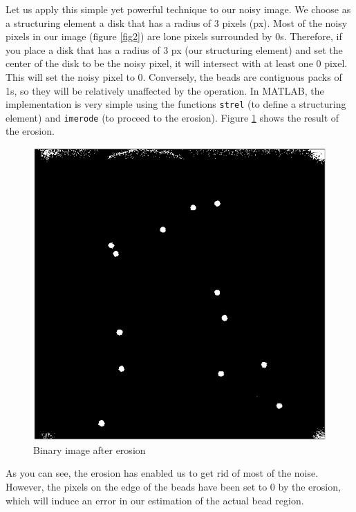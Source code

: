 \documentclass[a4paper]{article}
\begin{document}
\begin{enumerate}
    Let us apply this simple yet powerful technique to our noisy image. We choose as a structuring element a disk that has a radius of 3 pixels (px). Most of the noisy pixels in our image (figure \ref{fig2}) are lone pixels surrounded by 0s. Therefore, if you place a disk that has a radius of 3 px (our structuring element) and set the center of the disk to be the noisy pixel, it will intersect with at least one 0 pixel. This will set the noisy pixel to 0. Conversely, the beads are contiguous packs of 1s, so they will be relatively unaffected by the operation. In MATLAB, the implementation is very simple using the functions \verb|strel| (to define a structuring element) and \verb|imerode| (to proceed to the erosion). Figure \ref{fig3} shows the result of the erosion.
    
    \begin{figure}[H]
        \center
        \label{fig3}
        \includegraphics[scale=0.75]{firstbinerod.png}
        \caption{Binary image after erosion}
    \end{figure}

    As you can see, the erosion has enabled us to get rid of most of the noise. However, the pixels on the edge of the beads have been set to 0 by the erosion, which will induce an error in our estimation of the actual bead region. 
    

\end{enumerate}
\end{document}

